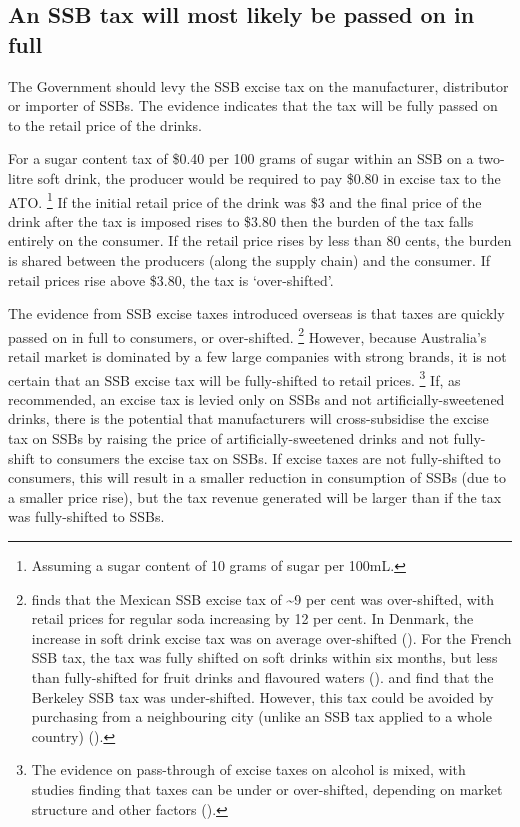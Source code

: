 \documentclass[embargoed]{grattan}
\begin{document}
\subsection{An SSB tax will most likely be passed on in full}\label{an-ssb-tax-will-most-likely-be-passed-on-in-full}

The Government should levy the SSB excise tax on the manufacturer, distributor or importer of SSBs.
The evidence indicates that the tax will be fully passed on to the retail price of the drinks.

For a sugar content tax of \$0.40 per 100 grams of sugar within an SSB on a two-litre soft drink, the producer would be required to pay \$0.80 in excise tax to the ATO.%
\footnote{Assuming a sugar content of 10 grams of sugar per 100mL.} If the initial retail price of the drink was \$3 and the final price of the drink after the tax is imposed rises to \$3.80 then the burden of the tax falls entirely on the consumer.
If the retail price rises by less than 80 cents, the burden is shared between the producers (along the supply chain) and the consumer.
If retail prices rise above \$3.80, the tax is `over-shifted'.

The evidence from SSB excise taxes introduced overseas is that taxes are quickly passed on in full to consumers, or over-shifted.%
\footnote{\textcite{Grogger2015Sodataxesprices} finds that the Mexican SSB excise tax of \textasciitilde{}9 per cent was over-shifted, with retail prices for regular soda increasing by 12 per cent.
In Denmark, the increase in soft drink excise tax was on average over-shifted (\textcite{Bergman2010Areexcisetaxes}).
For the French SSB tax, the tax was fully shifted on soft drinks within six months, but less than fully-shifted for fruit drinks and flavoured waters (\textcites{Berardi2016impactsodataxon}{Bonnet2013Taxincidencestrategic}). \textcite{Cawley2015IncidenceTaxesSugar} and \textcite{Falbe2015Higherretailprices} find that the Berkeley SSB tax was under-shifted.
However, this tax could be avoided by purchasing from a neighbouring city (unlike an SSB tax applied to a whole country) (\textcite{Veerman2016ImpactTaxSugar}).} However, because Australia's retail market is dominated by a few large companies with strong brands, it is not certain that an SSB excise tax will be fully-shifted to retail prices.%
\footnote{The evidence on pass-through of excise taxes on alcohol is mixed, with studies finding that taxes can be under or over-shifted, depending on market structure and other factors (\textcites{Cawley2015economyscalesselective}{DeCicca2013Whopayscigarette}{Dube2004Multiplediscretenessproduct}).} If, as recommended, an excise tax is levied only on SSBs and not artificially-sweetened drinks, there is the potential that manufacturers will cross-subsidise the excise tax on SSBs by raising the price of artificially-sweetened drinks and not fully-shift to consumers the excise tax on SSBs.
If excise taxes are not fully-shifted to consumers, this will result in a smaller reduction in consumption of SSBs (due to a smaller price rise), but the tax revenue generated will be larger than if the tax was fully-shifted to SSBs.
\end{document}
